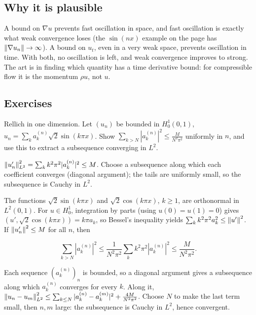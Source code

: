 \subsection*{Why it is plausible}

A bound on $\nabla u$ prevents fast oscillation in space, and fast oscillation is exactly what weak convergence loses (the $\sin(nx)$ example on the  page has $\left\lVert \nabla u_n\right\rVert\to\infty$). A bound on $u_t$, even in a very weak space, prevents oscillation in time. With both, no oscillation is left, and weak convergence improves to strong. The art is in finding which quantity has a time derivative bound: for compressible flow it is the momentum $\rho u$, not $u$.

\subsection*{Exercises}

\begin{exercise}
  Rellich in one dimension. Let $(u_n)$ be bounded in $H^1_0(0,1)$, $u_n = \sum_k a_k^{(n)}\sqrt2\sin(k\pi x)$. Show $\sum_{k> N}|a_k^{(n)}|^2 \le \frac{M}{N^2\pi^2}$ uniformly in $n$, and use this to extract a subsequence converging in $L^2$.
  \begin{hint}
    $\left\lVert u_n'\right\rVert_{L^2}^2 = \sum_k k^2\pi^2|a_k^{(n)}|^2 \le M$. Choose a subsequence along which each coefficient converges (diagonal argument); the tails are uniformly small, so the subsequence is Cauchy in $L^2$.
  \end{hint}
  \begin{solution}
    The functions $\sqrt2\sin(k\pi x)$ and $\sqrt2\cos(k\pi x)$, $k \ge 1$, are orthonormal in $L^2(0,1)$. For $u \in H^1_0$, integration by parts (using $u(0) = u(1) = 0$) gives $(u', \sqrt2\cos(k\pi x)) = k\pi a_k$, so Bessel's inequality yields $\sum_kk^2\pi^2a_k^2 \le \left\lVert u'\right\rVert^2$. If $\left\lVert u_n'\right\rVert^2 \le M$ for all $n$, then

    \[ \sum_{k> N}|a_k^{(n)}|^2 \le \frac{1}{N^2\pi^2}\sum_kk^2\pi^2|a_k^{(n)}|^2 \le \frac{M}{N^2\pi^2}. \]

    Each sequence $(a_k^{(n)})_n$ is bounded, so a diagonal argument gives a subsequence along which $a_k^{(n)}$ converges for every $k$. Along it, $\left\lVert u_n - u_m\right\rVert_{L^2}^2 \le \sum_{k\le N}|a_k^{(n)} - a_k^{(m)}|^2 + \frac{4M}{N^2\pi^2}$. Choose $N$ to make the last term small, then $n, m$ large: the subsequence is Cauchy in $L^2$, hence convergent.
  \end{solution}
\end{exercise}

